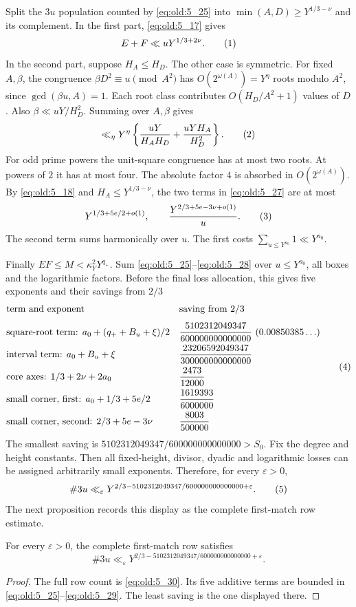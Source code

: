 Split the \(3u\) population counted by \eqref{eq:old:5_25} into
\(\min(A,D)\ge Y^{1/3-\nu}\) and its complement. In the first part,
\eqref{eq:old:5_17} gives
\[
 E+F\ll uY^{1/3+2\nu}.
\AutoTag{eq:old:5_26}
\]
In the second part, suppose \(H_A\le H_D\). The other case is symmetric.
For fixed \(A,\beta\), the congruence
\(\beta D^2\equiv u\pmod{A^2}\) has
\(O(2^{\omega(A)})=Y^\eta\) roots modulo \(A^2\), since
\(\gcd(\beta u,A)=1\). Each root class contributes
\(O(H_D/A^2+1)\) values of \(D\). Also
\(\beta\ll uY/H_D^2\). Summing over \(A,\beta\) gives
\[
    \ll_\eta Y^\eta\left\{\frac{uY}{H_AH_D}
                 +\frac{uYH_A}{H_D^2}\right\}.
\AutoTag{eq:old:5_27}
\]
For odd prime powers the unit-square congruence has at most two roots.
At powers of \(2\) it has at most four. The absolute factor \(4\) is
absorbed in \(O(2^{\omega(A)})\).
By \eqref{eq:old:5_18} and \(H_A\le Y^{1/3-\nu}\), the two terms in \eqref{eq:old:5_27} are at
most
\[
 Y^{1/3+5e/2+o(1)},\qquad
 \frac{Y^{2/3+5e-3\nu+o(1)}}u.
\AutoTag{eq:old:5_28}
\]
The second term sums harmonically over \(u\). The first costs
\(\sum_{u\le Y^{a_0}}1\ll Y^{a_0}\).

Finally \(EF\le M<\kappa_Y^2Y^{q_+}\). Sum \eqref{eq:old:5_25}--\eqref{eq:old:5_28} over
\(u\le Y^{a_0}\), all boxes and the logarithmic factors. Before the final
loss allocation, this gives five exponents and their savings from $2/3$
\[
\begin{array}{@{}ll@{}}
\text{term and exponent} & \text{saving from }2/3\\[8pt]
\text{square-root term: }a_0+(q_++B_u+\xi)/2 &
  \dfrac{5102312049347}{600000000000000}\ (0.00850385\ldots)\\[7pt]
\text{interval term: }a_0+B_u+\xi &
  \dfrac{23206592049347}{300000000000000}\\[7pt]
\text{core axes: }1/3+2\nu+2a_0 & \dfrac{2473}{12000}\\[7pt]
\text{small corner, first: }a_0+1/3+5e/2 & \dfrac{1619393}{6000000}\\[7pt]
\text{small corner, second: }2/3+5e-3\nu & \dfrac{8003}{500000}
\end{array}\AutoTag{eq:old:5_29}
\]
The smallest saving is \(5102312049347/600000000000000>S_0\).
Fix the degree and height constants. Then all fixed-height, divisor,
dyadic and logarithmic losses can be assigned arbitrarily small
exponents. Therefore, for every \(\varepsilon>0\),
\[
 \#3u\ll_\varepsilon
 Y^{2/3-5102312049347/600000000000000+\varepsilon}.
\AutoTag{eq:old:5_30}
\]
The next proposition records this display as the complete first-match row
estimate.
\begin{rowproposition}\label{prop:row-3u}
For every \(\varepsilon>0\), the complete first-match row satisfies
\[
 \#3u\ll_\varepsilon
 Y^{2/3-5102312049347/600000000000000+\varepsilon}.
\]
\end{rowproposition}
\begin{proof}
The full row count is \eqref{eq:old:5_30}. Its five additive terms are bounded in
\eqref{eq:old:5_25}--\eqref{eq:old:5_29}. The least saving is the one displayed there.
\end{proof}

